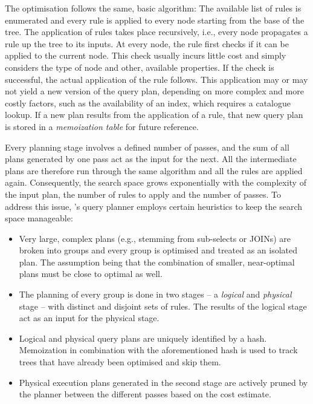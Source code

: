 The optimisation follows the same, basic algorithm: The available list of rules is enumerated and every rule is applied to every node starting from the base of the tree. The application of rules takes place recursively, i.e., every node propagates a rule up the tree to its inputs. At every node, the rule first checks if it can be applied to the current node. This check usually incurs little cost and simply considers the type of node and other, available properties. If the check is successful, the actual application of the rule follows. This application may or may not yield a new version of the query plan, depending on more complex and more costly factors, such as the availability of an index, which requires a catalogue lookup. If a new plan results from the application of a rule, that new query plan is stored in a \emph{memoization table} for future reference. 

Every planning stage involves a defined number of passes, and the sum of all plans generated by one pass act as the input for the next. All the intermediate plans are therefore run through the same algorithm and all the rules are applied again. Consequently, the search space grows exponentially with the complexity of the input plan, the number of rules to apply and the number of passes. To address this issue, \cottontail{}'s query planner employs certain heuristics to keep the search space manageable:

\begin{itemize}
    \item Very large, complex plans (e.g., stemming from sub-selects or JOINs) are broken into groups and every group is optimised and treated as an isolated plan. The assumption being that the combination of smaller, near-optimal plans must be close to optimal as well.
    \item The planning of every group is done in two stages -- a \emph{logical} and \emph{physical} stage -- with distinct and disjoint sets of rules. The results of the logical stage act as an input for the physical stage.
    \item Logical and physical query plans are uniquely identified by a hash. Memoization in combination with the aforementioned hash is used to track trees that have already been optimised and skip them.
    \item Physical execution plans generated in the second stage are actively pruned by the planner between the different passes based on the cost estimate.
\end{itemize}

